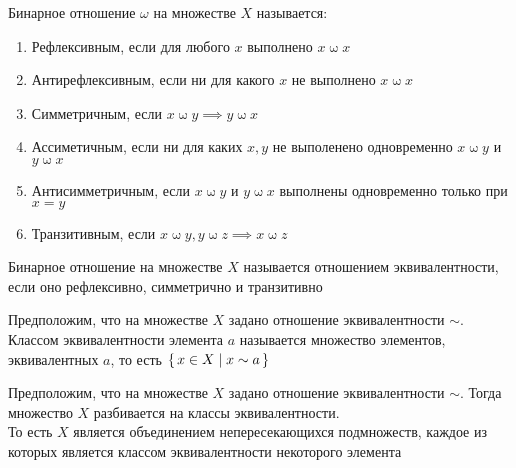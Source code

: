 \begin{definition}
	Бинарное отношение $\omega$ на множестве $X$ называется:
	\begin{enumerate}
		\item Рефлексивным, если для любого $x$ выполнено $x \mathrel\omega x$
		\item Антирефлексивным, если ни для какого $x$ не выполнено $x \mathrel\omega x$
		\item Симметричным, если $x \mathrel\omega y \implies y \mathrel\omega x$
		\item Ассиметичным, если ни для каких $x, y$ не выполенено одновременно $x \mathrel\omega y$ и $y \mathrel\omega x$
		\item Антисимметричным, если $x \mathrel\omega y$ и $y \mathrel\omega x$ выполнены одновременно только при $x = y$
		\item Транзитивным, если $x \mathrel\omega y, y \mathrel\omega z \implies x \mathrel\omega z$
	\end{enumerate}
\end{definition}

\begin{definition}
	Бинарное отношение на множестве $X$ называется отношением эквивалентности, если оно рефлексивно, симметрично и транзитивно
\end{definition}

\begin{definition}
	Предположим, что на множестве $X$ задано отношение эквивалентности $\sim$. \\
	Классом эквивалентности элемента $a$ называется множество элементов, эквивалентных $a$, то есть $\set{x \in X | x \sim a}$
\end{definition}

\begin{theorem}
	Предположим, что на множестве $X$ задано отношение эквивалентности $\sim$. Тогда множество $X$ разбивается на классы эквивалентности. \\
	То есть $X$ является объединением непересекающихся подмножеств, каждое из которых является классом эквивалентности некоторого элемента
\end{theorem}

